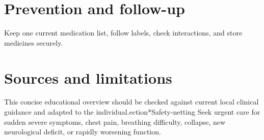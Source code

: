 \section*{Prevention and follow-up}
Keep one current medication list, follow labels, check interactions, and store medicines securely.

\section*{Sources and limitations}
This concise educational overview should be checked against current local clinical guidance and adapted to the individual.ection*{Safety-netting}
Seek urgent care for sudden severe symptoms, chest pain, breathing difficulty, collapse, new neurological deficit, or rapidly worsening function.
